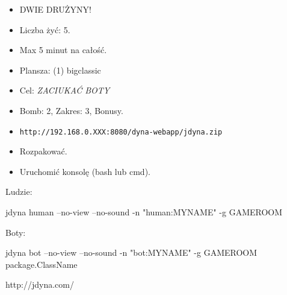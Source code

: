 \documentclass[compress]{beamer}
\begin{document}
\begin{frame}[plain]
    \begin{center}
    \end{center}
\end{frame}

\begin{frame}[plain]
    
    \bigskip
    \begin{itemize}
        \item DWIE DRUŻYNY!
        \item Liczba żyć: 5.
        \item Max 5 minut na całość.
        \item Plansza: (1) bigclassic
        \item Cel: \emph{ZACIUKAĆ BOTY}

        \bigskip\color{gray}
        \item Bomb: 2, Zakres: 3, Bonusy. 
    \end{itemize}
\end{frame}

\begin{frame}
    \begin{itemize}
        \item \texttt{http://192.168.0.XXX:8080/dyna-webapp/jdyna.zip}
        \item Rozpakować.
        \item Uruchomić konsolę (bash lub cmd).
    \end{itemize}
\end{frame}

\begin{frame}
    Ludzie:
    \begin{screenblock}[fontsize=\Large, numbers=none]
jdyna human --no-view --no-sound 
       -n "human:MYNAME" -g GAMEROOM
    \end{screenblock}

    \bigskip
    Boty:
    \begin{screenblock}[fontsize=\Large, numbers=none]
jdyna bot --no-view --no-sound 
       -n "bot:MYNAME" -g GAMEROOM 
           package.ClassName
    \end{screenblock}    
\end{frame}

\begin{frame}[plain]
    \begin{center}
    http://jdyna.com/
    \end{center}
\end{frame}
\end{document}

